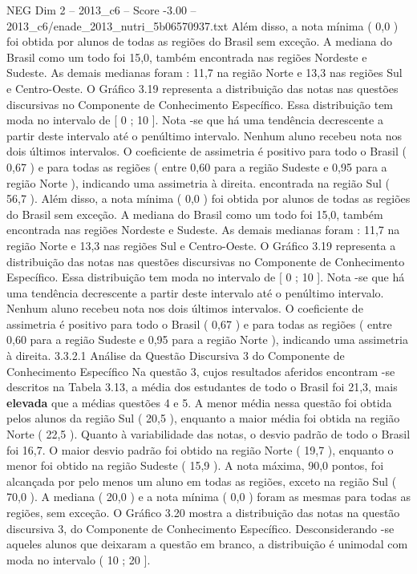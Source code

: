 \begin{textsample}{NEG Dim 2 – 2013\_c6 – Score -3.00 – 2013\_c6/enade\_2013\_nutri\_5b06570937.txt}
Além disso, a nota mínima ( 0,0 ) foi obtida por alunos de todas as regiões do Brasil sem exceção.
A mediana do Brasil como um todo foi 15,0, também encontrada nas regiões Nordeste e Sudeste.
As demais medianas foram : 11,7 na região Norte e 13,3 nas regiões Sul e Centro-Oeste.
O Gráfico 3.19 representa a distribuição das notas nas questões discursivas no Componente de Conhecimento Específico.
Essa distribuição tem moda no intervalo de [ 0 ; 10 ].
Nota -se que há uma tendência decrescente a partir deste intervalo até o penúltimo intervalo.
Nenhum aluno recebeu nota nos dois últimos intervalos.
O coeficiente de assimetria é positivo para todo o Brasil ( 0,67 ) e para todas as regiões ( entre 0,60 para a região Sudeste e 0,95 para a região Norte ), indicando uma assimetria à direita. encontrada na região Sul ( 56,7 ).
Além disso, a nota mínima ( 0,0 ) foi obtida por alunos de todas as regiões do Brasil sem exceção.
A mediana do Brasil como um todo foi 15,0, também encontrada nas regiões Nordeste e Sudeste.
As demais medianas foram : 11,7 na região Norte e 13,3 nas regiões Sul e Centro-Oeste.
O Gráfico 3.19 representa a distribuição das notas nas questões discursivas no Componente de Conhecimento Específico.
Essa distribuição tem moda no intervalo de [ 0 ; 10 ].
Nota -se que há uma tendência decrescente a partir deste intervalo até o penúltimo intervalo.
Nenhum aluno recebeu nota nos dois últimos intervalos.
O coeficiente de assimetria é positivo para todo o Brasil ( 0,67 ) e para todas as regiões ( entre 0,60 para a região Sudeste e 0,95 para a região Norte ), indicando uma assimetria à direita. 3.3.2.1 Análise da Questão Discursiva 3 do Componente de Conhecimento Específico Na questão 3, cujos resultados aferidos encontram -se descritos na Tabela 3.13, a média dos estudantes de todo o Brasil foi 21,3, mais \textbf{elevada} que a médias questões 4 e 5.
A menor média nessa questão foi obtida pelos alunos da região Sul ( 20,5 ), enquanto a maior média foi obtida na região Norte ( 22,5 ).
Quanto à variabilidade das notas, o desvio padrão de todo o Brasil foi 16,7.
O maior desvio padrão foi obtido na região Norte ( 19,7 ), enquanto o menor foi obtido na região Sudeste ( 15,9 ).
A nota máxima, 90,0 pontos, foi alcançada por pelo menos um aluno em todas as regiões, exceto na região Sul ( 70,0 ).
A mediana ( 20,0 ) e a nota mínima ( 0,0 ) foram as mesmas para todas as regiões, sem exceção.
O Gráfico 3.20 mostra a distribuição das notas na questão discursiva 3, do Componente de Conhecimento Específico.
Desconsiderando -se aqueles alunos que deixaram a questão em branco, a distribuição é unimodal com moda no intervalo ( 10 ; 20 ].

\end{textsample}
